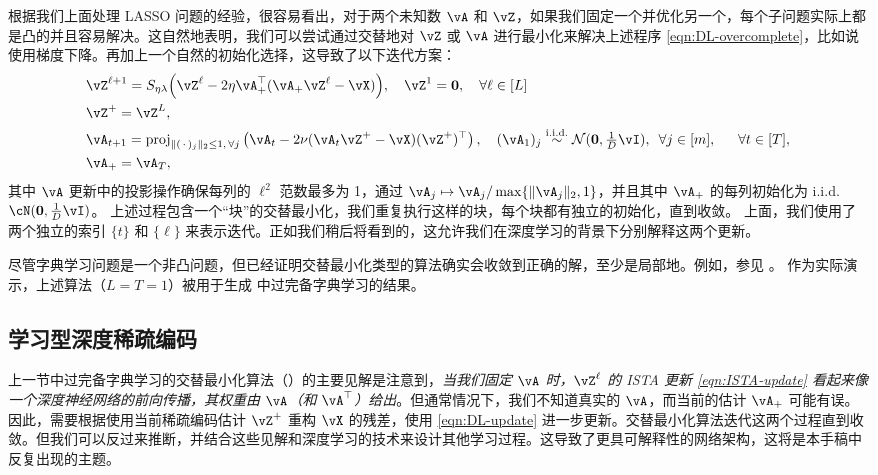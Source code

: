 \documentclass[../../book-main_zh.tex]{subfiles}
\begin{document}
根据我们上面处理 LASSO 问题的经验，很容易看出，对于两个未知数 \(\vA\) 和 \(\vZ\)，如果我们固定一个并优化另一个，每个子问题实际上都是凸的并且容易解决。这自然地表明，我们可以尝试通过交替地对 \(\vZ\) 或 \(\vA\) 进行最小化来解决上述程序 \eqref{eqn:DL-overcomplete}，比如说使用梯度下降。再加上一个自然的初始化选择，这导致了以下迭代方案：
\begin{align}
    &\vZ^{\ell + 1} = S_{\eta\lambda}\rp{\vZ^{\ell}
    - 2\eta\vA_{+}^{\top}(\vA_{+}\vZ^{\ell} - \vX)},
    \quad \vZ^1 = \Zero,
    \quad \forall \ell \in [L] \label{eqn:ISTA-update}\\ 
    &\vZ^+ = \vZ^L,\\
    &\vA_{t + 1} = \proj_{\norm{(\,\cdot\,)_j}_2 \leq 1,\,\forall j}\left(
    \vA_{t} - 2\nu (\vA_{t}\vZ^+ - \vX)(\vZ^+)^\top
    \right), 
    \quad (\vA_{1})_j \simiid \dNorm(\vzero, \tfrac{1}{D}\vI), \enspace \forall
    j \in [m], 
    \quad\;\; \forall t \in [T],\label{eqn:DL-update}\\
    &\vA_+ = \vA_T,
\end{align}
其中 $\vA$ 更新中的投影操作确保每列的 $\ell^2$ 范数最多为 1，通过 $\vA_j \mapsto \vA_j / \max \set{\norm{\vA_j}_2, 1}$，并且其中 $\vA_+$ 的每列初始化为 i.i.d. $\cN(\Zero, \tfrac{1}{D} \vI)$。
上述过程包含一个“块”的交替最小化，我们重复执行这样的块，每个块都有独立的初始化，直到收敛。
上面，我们使用了两个独立的索引 $\{t\}$ 和 $\{\ell\}$ 来表示迭代。正如我们稍后将看到的，这允许我们在深度学习的背景下分别解释这两个更新。

尽管字典学习问题是一个非凸问题，但已经证明交替最小化类型的算法确实会收敛到正确的解，至少是局部地。例如，参见 \cite{alekh-2016}。
作为实际演示，上述算法（$L = T = 1$）被用于生成  中过完备字典学习的结果。

\subsection{学习型深度稀疏编码}
\label{sec:LISTA}
上一节中过完备字典学习的交替最小化算法（）的主要见解是注意到，\textit{当我们固定 \(\vA\) 时，$\vZ^\ell$ 的 ISTA 更新 \eqref{eqn:ISTA-update} 看起来像一个深度神经网络的前向传播，其权重由 \(\vA\)（和 \(\vA^{\top}\)）给出}。但通常情况下，我们不知道真实的 $\vA$，而当前的估计 $\vA_+$ 可能有误。因此，需要根据使用当前稀疏编码估计 $\vZ^+$ 重构 $\vX$ 的残差，使用 \eqref{eqn:DL-update} 进一步更新。交替最小化算法迭代这两个过程直到收敛。但我们可以反过来推断，并结合这些见解和深度学习的技术来设计其他学习过程。这导致了更具可解释性的网络架构，这将是本手稿中反复出现的主题。
\end{document}
